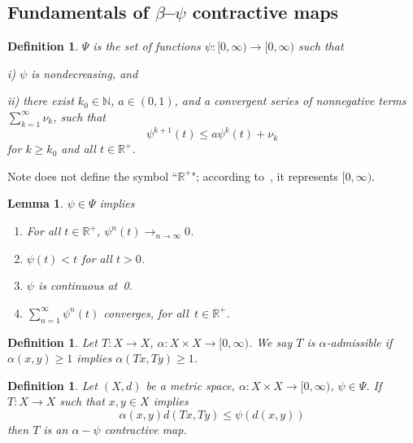 \documentclass{article}
\newtheorem{lem}[thm]{Lemma}
\newtheorem{definition}[thm]{Definition}
\numberwithin{thm}{section}
\def\N{{\mathbb N}}
\def\R{{\mathbb R}}
\begin{document}
\subsection{Fundamentals of $\beta$--$\psi$ contractive maps}
\begin{definition}
    {\rm \cite{JyotiRani17,SametEtAl}}
    $\Psi$ is the set of
    functions $\psi: [0, \infty) \to [0, \infty)$
    such that 

    i) $\psi$ is nondecreasing, and

    ii) there exist $k_0 \in \N$, $a \in (0,1)$, and a 
    convergent series of 
    nonnegative terms
    $\sum_{k=1}^{\infty} \nu_k$, such that
    \[ \psi^{k+1}(t) \le
       a \psi^k(t) + \nu_k
    \]
    for $k \ge k_0$ and all
    $t \in \R^+$.
\end{definition}

Note \cite{JyotiRani17} does not
define the symbol ``$\R^+$"; according
to~\cite{SametEtAl},
it represents
$[0,\infty)$.

\begin{lem}
    {\rm \cite{SametEtAl}}
    \label{PsiProps}
    $\psi \in \Psi$
    implies
    \begin{enumerate}
        \item For all $t \in \R^+$,
        $\psi^n(t) \to_{n \to \infty} 0$.
        \item $\psi(t) < t$
        for all $t>0$.
        \item $\psi$ is
        continuous at~0.
        \item $\sum_{n=1}^{\infty} \psi^n(t)$ converges, for
        all~$t \in \R^+$.
    \end{enumerate}
\end{lem}

\begin{definition}
\label{admissibleDef}
{\rm \cite{SametEtAl}}
    Let $T: X \to X$,
    $\alpha: X \times X \to [0,\infty)$. We say
    $T$ is {\em $\alpha$-admissible} if
    $\alpha(x,y) \ge 1$
    implies $\alpha(Tx,Ty) \ge 1$.
\end{definition}

\begin{definition}
    \label{alpha-psi-contractDef}
    Let $(X,d)$ be a metric
    space, $\alpha: X \times X \to [0,\infty)$,
    $\psi \in \Psi$. If
    $T: X \to X$ such
    that $x,y \in X$ implies
    \[ \alpha(x,y)d(Tx,Ty)
    \le \psi(d(x,y))
    \]
    then $T$ is an
    {\em $\alpha-\psi$ 
    contractive map}.
\end{definition}
\end{document}
